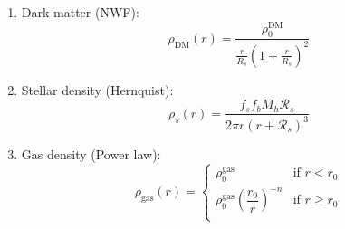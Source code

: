 \documentclass{beamer}
\begin{document}
\begin{frame}
	\begin{enumerate}
		\item Dark matter (NWF):
		\begin{equation}\label{eq: dmdensity}
			\rho_\text{DM}(r) = \dfrac{\rho_0^\text{DM}}{\frac{r}{R_s}\left(1 + \frac{r}{R_s}\right)^2}
		\end{equation}
		\item Stellar density (Hernquist):
		\begin{equation}
			\rho_s(r) = \dfrac{f_sf_bM_h \mathcal{R}_s}{2\pi r(r + \mathcal{R}_s)^3}
		\end{equation}
		\item Gas density (Power law):
		\begin{equation}
			\rho_\text{gas}(r) = \left \{
			\begin{matrix}
			\rho_0^\text{gas} & \text{if $r < r_0$}\\
			\rho_0^\text{gas}\left(\dfrac{r_0}{r}\right)^{-n} & \text{if $r \geq r_0$}\\
			\end{matrix}
			\right.
		\end{equation}
	\end{enumerate}
\end{frame}
\end{document}
